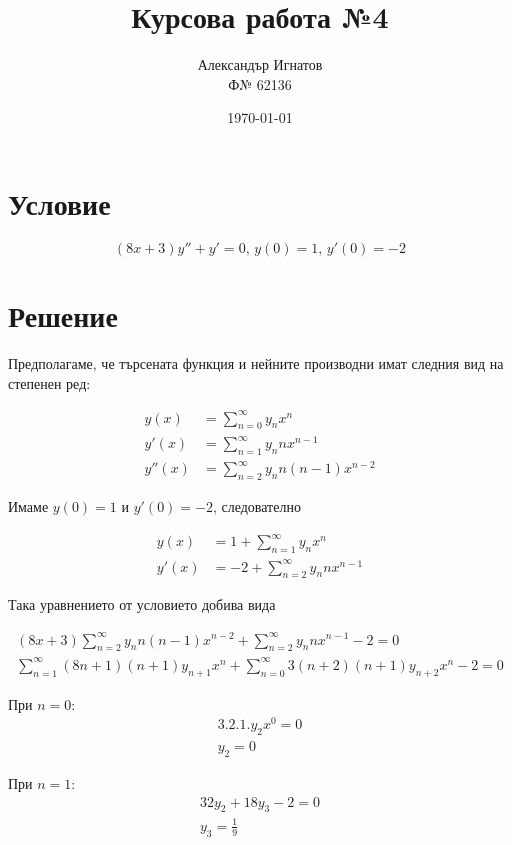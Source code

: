 \documentclass{article}
\title{Курсова работа №4}
\author{Александър Игнатов \\ Ф№ 62136 }
\date{\today}
\begin{document}
\maketitle

\section*{Условие}

\[
    (8x+3)y'' + y' = 0,\, y(0) = 1,\, y'(0) = -2
\]

\section*{Решение}

Предполагаме, че търсената функция и нейните производни имат следния вид на степенен ред:

\begin{align*}
    y(x)   &= \sum_{n=0}^{\infty} y_n x^n \\
    y'(x)  &= \sum_{n=1}^{\infty} y_n n x^{n-1} \\
    y''(x) &= \sum_{n=2}^{\infty} y_n n(n-1) x^{n-2}
\end{align*}

Имаме \( y(0) = 1 \) и \( y'(0) = -2 \), следователно

\begin{align*}
    y(x)  &= 1 + \sum_{n=1}^{\infty} y_n x^n \\
    y'(x) &= -2 + \sum_{n=2}^{\infty} y_n n x^{n-1}
\end{align*}

Така уравнението от условието добива вида

\begin{gather*}
    (8x+3)\sum_{n=2}^\infty y_n n(n-1)x^{n-2} + \sum_{n=2} ^\infty y_n n x^{n-1} - 2 = 0 \\
    \sum_{n=1}^\infty (8n+1)(n+1)y_{n+1}x^n + \sum_{n=0}^\infty 3(n+2)(n+1)y_{n+2}x^n - 2 = 0
\end{gather*}

При \( n = 0 \):
\begin{gather*}
    3 . 2 . 1 . y_2 x^0 = 0 \\
    y_2 = 0
\end{gather*}

При \( n = 1 \):
\begin{gather*}
    32y_2 + 18y_3 - 2 = 0 \\
    y_3 = \frac{1}{9}
\end{gather*}
\end{document}
